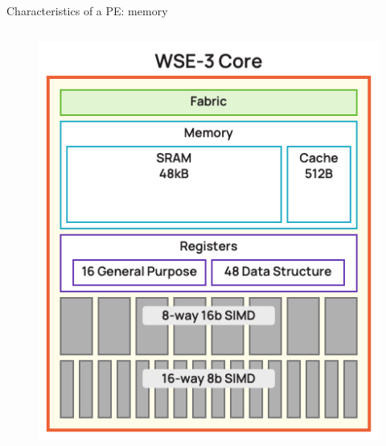 \documentclass[dvipdfmx, 11pt, aspectratio=169]{beamer}   %
\begin{document}
\begin{frame}{Characteristics of a PE: memory}
\begin{columns}
\begin{figure}
    \includegraphics[scale=0.22]{img/wse3Core.png}
\end{figure}
\end{columns}
\end{frame}
\end{document}
